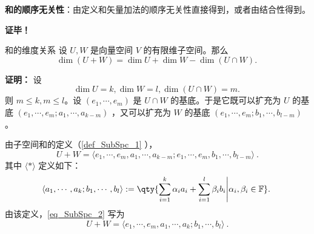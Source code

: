\textbf{和的顺序无关性}：由定义和矢量加法的顺序无关性直接得到，或者由结合性得到。

\textbf{证毕！}



\begin{theorem}{和的维度关系}
设 $U,W$ 是向量空间 $V$ 的有限维子空间。那么
\begin{equation}
\dim (U+W)=\dim U+\dim W-\dim(U\cap W).~
\end{equation}

\end{theorem}

\textbf{证明：}
设
\begin{equation}
\dim U=k,\dim W=l,\dim(U\cap W)=m.~
\end{equation}
则 $m\leq k,m\leq l$。设 $(e_1,\cdots,e_m)$ 是 $U\cap W$ 的基底。于是它既可以扩充为 $U$ 的基底 $(e_1,\cdots,e_m;a_1,\cdots,a_{k-m})$ ，又可以扩充为 $W$ 的基底 $(e_1,\cdots,e_m;b_1,\cdots,b_{l-m})$。

由子空间和的定义（\autoref{def_SubSpc_1} ），
\begin{equation}\label{eq_SubSpc_2}
U+W=\langle e_1,\cdots,e_m,a_1,\cdots,a_{k-m};e_1,\cdots,e_m,b_1,\cdots,b_{l-m}\rangle~.
\end{equation}
其中 $\langle*\rangle$ 定义如下：
\begin{equation}
\langle a_1,\cdots,a_k;b_1,\cdots,b_l\rangle:=\qty{\sum_{i=1}^k\alpha_i a_i+\sum_{i=1}^l\beta_i b_i\Bigg|\alpha_i,\beta_i\in \mathbb F}.~
\end{equation}
由该定义，\autoref{eq_SubSpc_2} 写为
\begin{equation}
U+W=\langle e_1,\cdots,e_m,a_1,\cdots,a_k;b_1,\cdots,b_l\rangle~.
\end{equation}

